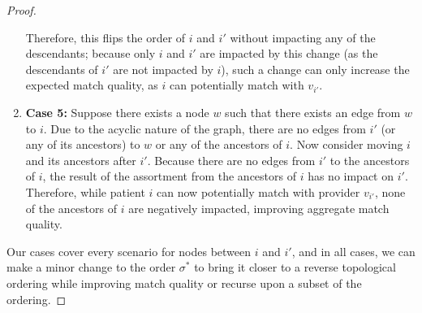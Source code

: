\begin{proof}
\begin{enumerate}
    Therefore, this flips the order of $i$ and $i'$ without impacting any of the descendants; because only $i$ and $i'$ are impacted by this change (as the descendants of $i'$ are not impacted by $i$), such a change can only increase the expected match quality, as $i$ can potentially match with $v_{i'}$. 
    \item \textbf{Case 5:} Suppose there exists a node $w$ such that there exists an edge from $w$ to $i$. 
    Due to the acyclic nature of the graph, there are no edges from $i'$ (or any of its ancestors) to $w$ or any of the ancestors of $i$. 
    Now consider moving $i$ and its ancestors after $i'$. 
    Because there are no edges from $i'$ to the ancestors of $i$, the result of the assortment from the ancestors of $i$ has no impact on $i'$. 
    Therefore, while patient $i$ can now potentially match with provider $v_{i'}$, none of the ancestors of $i$ are negatively impacted, improving aggregate match quality.  
\end{enumerate}
Our cases cover every scenario for nodes between $i$ and $i'$, and in all cases, we can make a minor change to the order $\sigma^{*}$ to bring it closer to a reverse topological ordering while improving match quality or recurse upon a subset of the ordering. 
\end{proof}


